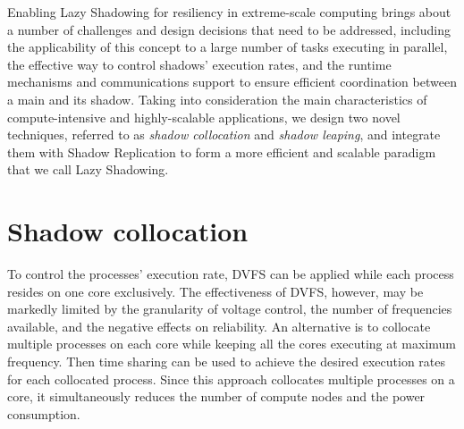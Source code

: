 Enabling Lazy Shadowing for resiliency in extreme-scale computing 
brings about a number of challenges and design decisions that need to be addressed, including the applicability of this concept to a large number of 
tasks executing in parallel, the effective way to control shadows' execution rates, and the runtime mechanisms and 
communications support to ensure efficient coordination between a 
main and its shadow.
Taking into consideration the main characteristics of compute-intensive and highly-scalable applications, we design two novel techniques, referred to as {\it shadow collocation} and {\it shadow leaping}, 
and integrate them with Shadow Replication to form a more efficient and scalable paradigm that we call Lazy Shadowing.


\section{Shadow collocation}
To control the processes' execution rate, DVFS can be applied while each process resides on one core exclusively. 
The effectiveness of DVFS, however, may be markedly 
limited by the granularity of voltage control, the number of frequencies available, and the negative effects on 
reliability. 
An alternative is to collocate multiple processes on each core while keeping all the cores executing at maximum frequency. 
Then time sharing can be used to achieve the desired execution rates for each collocated process. 
Since this approach collocates multiple processes on a core, it simultaneously reduces the number of compute nodes and 
the power consumption. 


